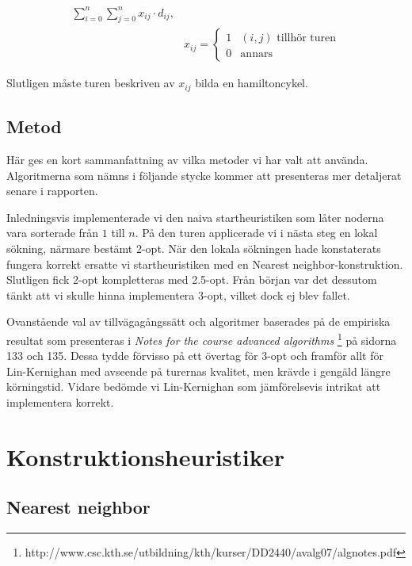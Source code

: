 \documentclass[a4paper,12pt]{article}
\renewcommand{\*}{\ensuremath{\cdot}}
\begin{document}
\begin{align}
    \sum_{i=0}^{n}{\sum_{j=0}^{n}{x_{ij} \cdot d_{ij}}},  & \\
    & x_{ij} =
    \begin{cases}
        1 & (i,j) \textrm{ tillhör turen} \\
        0 & \textrm{annars}
    \end{cases}
    \label{eq:tourSum}
\end{align}


Slutligen måste turen beskriven av $x_{ij}$ bilda en hamiltoncykel.

\subsection{Metod}

Här ges en kort sammanfattning av vilka metoder vi har valt att använda.
Algoritmerna som nämns i följande stycke kommer att presenteras mer detaljerat
senare i rapporten.

Inledningsvis implementerade vi den naiva startheuristiken som låter noderna
vara sorterade från $1$ till $n$. På den turen applicerade vi i nästa steg en
lokal sökning, närmare bestämt 2-opt. När den lokala sökningen hade konstaterats
fungera korrekt ersatte vi startheuristiken med en Nearest
neighbor-konstruktion. Slutligen fick 2-opt kompletteras med 2.5-opt. Från
början var det dessutom tänkt att vi skulle hinna implementera 3-opt, vilket
dock ej blev fallet.

Ovanstående val av tillvägagångssätt och algoritmer baserades på de empiriska
resultat som presenteras i \textit{Notes for the course advanced algorithms}
\footnote{http://www.csc.kth.se/utbildning/kth/kurser/DD2440/avalg07/algnotes.pdf}
på sidorna 133 och 135. Dessa tydde förvisso på ett övertag för 3-opt och
framför allt för Lin-Kernighan med avseende på turernas kvalitet, men krävde i
gengäld längre körningstid. Vidare bedömde vi Lin-Kernighan som jämförelsevis
intrikat att implementera korrekt.

\section{Konstruktionsheuristiker}

\subsection{Nearest neighbor}
\end{document}
